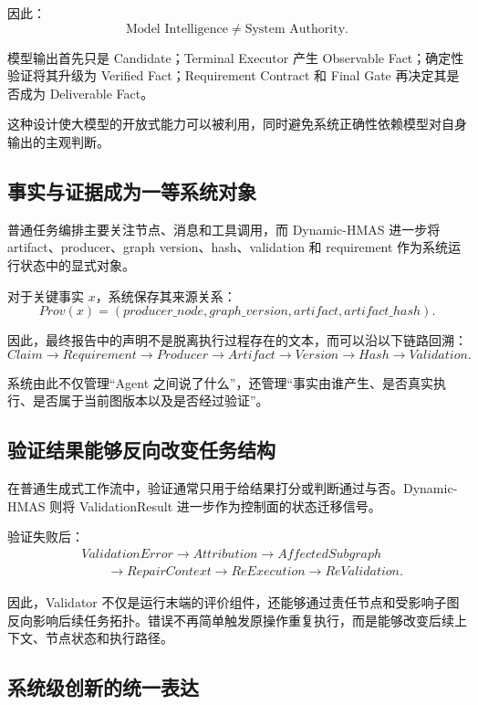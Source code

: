 \documentclass[UTF8,a4paper,12pt,oneside]{ctexbook}
\begin{document}
因此：
\[
\text{Model Intelligence}
\neq
\text{System Authority}.
\]

模型输出首先只是 Candidate；Terminal Executor 产生 Observable Fact；确定性验证将其升级为 Verified Fact；Requirement Contract 和 Final Gate 再决定其是否成为 Deliverable Fact。

这种设计使大模型的开放式能力可以被利用，同时避免系统正确性依赖模型对自身输出的主观判断。


\subsection{事实与证据成为一等系统对象}

普通任务编排主要关注节点、消息和工具调用，而 Dynamic-HMAS 进一步将 artifact、producer、graph version、hash、validation 和 requirement 作为系统运行状态中的显式对象。

对于关键事实 $x$，系统保存其来源关系：
\[
Prov(x)
=
(
producer\_node,
graph\_version,
artifact,
artifact\_hash
).
\]

因此，最终报告中的声明不是脱离执行过程存在的文本，而可以沿以下链路回溯：
\[
Claim
\rightarrow
Requirement
\rightarrow
Producer
\rightarrow
Artifact
\rightarrow
Version
\rightarrow
Hash
\rightarrow
Validation.
\]

系统由此不仅管理“Agent 之间说了什么”，还管理“事实由谁产生、是否真实执行、是否属于当前图版本以及是否经过验证”。


\subsection{验证结果能够反向改变任务结构}

在普通生成式工作流中，验证通常只用于给结果打分或判断通过与否。Dynamic-HMAS 则将 ValidationResult 进一步作为控制面的状态迁移信号。

验证失败后：
\[
\begin{aligned}
&ValidationError
\rightarrow Attribution
\rightarrow AffectedSubgraph \\[3pt]
&\qquad\rightarrow RepairContext
\rightarrow ReExecution
\rightarrow ReValidation.
\end{aligned}
\]

因此，Validator 不仅是运行末端的评价组件，还能够通过责任节点和受影响子图反向影响后续任务拓扑。错误不再简单触发原操作重复执行，而是能够改变后续上下文、节点状态和执行路径。


\subsection{系统级创新的统一表达}
\end{document}
